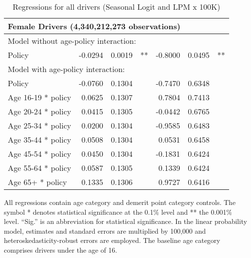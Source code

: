 \begin{table}
\begin{tabular}{l r r l r r l}
\hline 

\multicolumn{7}{l}{\textbf{Female Drivers} (4,340,212,273 observations)} \\ 

\hline
\multicolumn{7}{l}{Model without age-policy interaction: } \\ 
Policy                   &  -0.0294        &  0.0019       &   **       &  -0.8000        &  0.0495       &   **       \\ 
\hline
\multicolumn{7}{l}{Model with age-policy interaction: } \\ 
Policy                   &  -0.0760        &  0.1304       &            &  -0.7470        &  0.6348       &            \\ 
Age 16-19 * policy   &  0.0625        &  0.1307       &            &  0.7804        &  0.7413       &            \\ 
Age 20-24 * policy   &  0.0415        &  0.1305       &            &  -0.0442        &  0.6765       &            \\ 
Age 25-34 * policy   &  0.0200        &  0.1304       &            &  -0.9585        &  0.6483       &            \\ 
Age 35-44 * policy   &  0.0508        &  0.1304       &            &  0.0531        &  0.6458       &            \\ 
Age 45-54 * policy   &  0.0450        &  0.1304       &            &  -0.1831        &  0.6424       &            \\ 
Age 55-64 * policy   &  0.0587        &  0.1305       &            &  0.1339        &  0.6424       &            \\ 
Age 65+ * policy   &  0.1335        &  0.1306       &            &  0.9727        &  0.6416       &            \\ 

\hline 

\end{tabular} 
\caption{Regressions for all drivers (Seasonal Logit and LPM x 100K)} 
All regressions contain age category and demerit point category controls. 
The symbol * denotes statistical significance at the 0.1\% level 
and ** the 0.001\% level. 
``Sig.'' is an abbreviation for statistical significance. 
In the linear probability model, estimates and standard errors are multiplied by 100,000  
and heteroskedasticity-robust errors are employed. 
The baseline age category comprises drivers under the age of 16. 
\label{tab:seas_Logit_vs_LPMx100K_regs} 
\end{table} 
 
